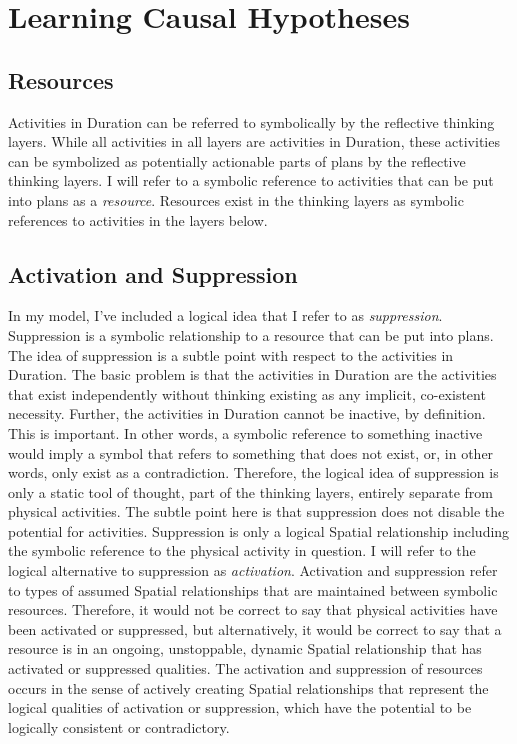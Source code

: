 \chapter{Learning Causal Hypotheses}
\label{chapter:learning_causal_hypotheses}

\section{Resources}

Activities in Duration can be referred to symbolically by the
reflective thinking layers.  While all activities in all layers are
activities in Duration, these activities can be symbolized as
potentially actionable parts of plans by the reflective thinking
layers.  I will refer to a symbolic reference to activities that can
be put into plans as a \emph{resource}.  Resources exist in the
thinking layers as symbolic references to activities in the layers
below.

\section{Activation and Suppression}

In my model, I've included a logical idea that I refer to as
\emph{suppression}.  Suppression is a symbolic relationship to a
resource that can be put into plans.  The idea of suppression is a
subtle point with respect to the activities in Duration.  The basic
problem is that the activities in Duration are the activities that
exist independently without thinking existing as any implicit,
co-existent necessity.  Further, the activities in Duration cannot be
inactive, by definition.  This is important.  In other words, a
symbolic reference to something inactive would imply a symbol that
refers to something that does not exist, or, in other words, only
exist as a contradiction.  Therefore, the logical idea of suppression
is only a static tool of thought, part of the thinking layers,
entirely separate from physical activities.  The subtle point here is
that suppression does not disable the potential for activities.
Suppression is only a logical Spatial relationship including the
symbolic reference to the physical activity in question.  I will refer
to the logical alternative to suppression as \emph{activation}.
Activation and suppression refer to types of assumed Spatial
relationships that are maintained between symbolic resources.
Therefore, it would not be correct to say that physical activities
have been activated or suppressed, but alternatively, it would be
correct to say that a resource is in an ongoing, unstoppable, dynamic
Spatial relationship that has activated or suppressed qualities.  The
activation and suppression of resources occurs in the sense of
actively creating Spatial relationships that represent the logical
qualities of activation or suppression, which have the potential to be
logically consistent or contradictory.

